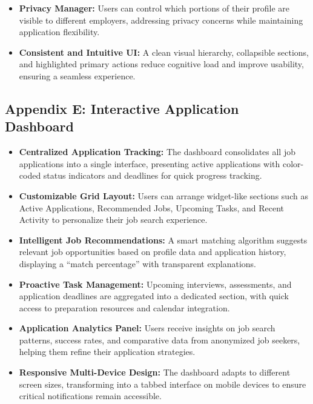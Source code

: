 \documentclass[
	letterpaper, %
]{jdf}
\begin{document}
\begin{sloppypar}
\begin{itemize}
    \item \textbf{Privacy Manager:} Users can control which portions of their profile are visible to different employers, addressing privacy concerns while maintaining application flexibility.
    
    \item \textbf{Consistent and Intuitive UI:} A clean visual hierarchy, collapsible sections, and highlighted primary actions reduce cognitive load and improve usability, ensuring a seamless experience.
\end{itemize}

\hfill \break
\subsection{Appendix E: Interactive Application Dashboard}
\begin{itemize}
    \item \textbf{Centralized Application Tracking:} The dashboard consolidates all job applications into a single interface, presenting active applications with color-coded status indicators and deadlines for quick progress tracking.
    
    \item \textbf{Customizable Grid Layout:} Users can arrange widget-like sections such as Active Applications, Recommended Jobs, Upcoming Tasks, and Recent Activity to personalize their job search experience.
    
    \item \textbf{Intelligent Job Recommendations:} A smart matching algorithm suggests relevant job opportunities based on profile data and application history, displaying a “match percentage” with transparent explanations.
    
    \item \textbf{Proactive Task Management:} Upcoming interviews, assessments, and application deadlines are aggregated into a dedicated section, with quick access to preparation resources and calendar integration.
    
    \item \textbf{Application Analytics Panel:} Users receive insights on job search patterns, success rates, and comparative data from anonymized job seekers, helping them refine their application strategies.
    
    \item \textbf{Responsive Multi-Device Design:} The dashboard adapts to different screen sizes, transforming into a tabbed interface on mobile devices to ensure critical notifications remain accessible.
\end{itemize}


\end{sloppypar}
\end{document}

